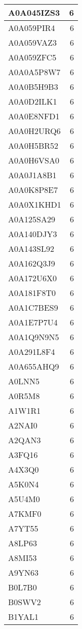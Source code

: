 \documentclass[
]{book}
\theoremstyle{definition}
\theoremstyle{definition}
\theoremstyle{definition}
\theoremstyle{definition}
\theoremstyle{remark}
\begin{document}
\begin{table}
\begin{tabular}{l|r}
\hline
A0A045IZS3 & 6\\
\hline
A0A059PIR4 & 6\\
\hline
A0A059VAZ3 & 6\\
\hline
A0A059ZFC5 & 6\\
\hline
A0A0A5P8W7 & 6\\
\hline
A0A0B5H9B3 & 6\\
\hline
A0A0D2ILK1 & 6\\
\hline
A0A0E8NFD1 & 6\\
\hline
A0A0H2URQ6 & 6\\
\hline
A0A0H5BR52 & 6\\
\hline
A0A0H6VSA0 & 6\\
\hline
A0A0J1A8B1 & 6\\
\hline
A0A0K8P8E7 & 6\\
\hline
A0A0X1KHD1 & 6\\
\hline
A0A125SA29 & 6\\
\hline
A0A140DJY3 & 6\\
\hline
A0A143SL92 & 6\\
\hline
A0A162Q3J9 & 6\\
\hline
A0A172U6X0 & 6\\
\hline
A0A181F8T0 & 6\\
\hline
A0A1C7BES9 & 6\\
\hline
A0A1E7P7U4 & 6\\
\hline
A0A1Q9N9N5 & 6\\
\hline
A0A291L8F4 & 6\\
\hline
A0A655AHQ9 & 6\\
\hline
A0LNN5 & 6\\
\hline
A0R5M8 & 6\\
\hline
A1W1R1 & 6\\
\hline
A2NAI0 & 6\\
\hline
A2QAN3 & 6\\
\hline
A3FQ16 & 6\\
\hline
A4X3Q0 & 6\\
\hline
A5K0N4 & 6\\
\hline
A5U4M0 & 6\\
\hline
A7KMF0 & 6\\
\hline
A7YT55 & 6\\
\hline
A8LP63 & 6\\
\hline
A8MI53 & 6\\
\hline
A9YN63 & 6\\
\hline
B0L7B0 & 6\\
\hline
B0SWV2 & 6\\
\hline
B1YAL1 & 6\\

\end{tabular}
\end{table}
\end{document}

